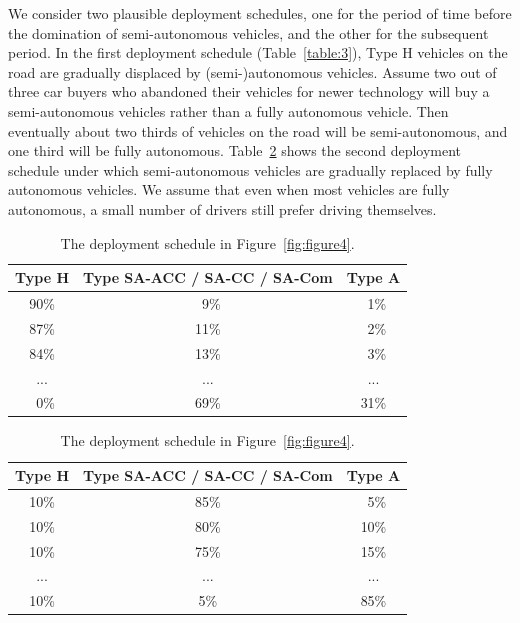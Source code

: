 We consider two plausible deployment schedules, one for the period of
time before the domination of semi-autonomous vehicles, and the other
for the subsequent period.  In the first deployment schedule
(Table~\ref{table:3}), Type H vehicles on the road are gradually
displaced by (semi-)autonomous vehicles.  Assume two out of three car
buyers who abandoned their vehicles for newer technology will buy a
semi-autonomous vehicles rather than a fully autonomous vehicle.  Then
eventually about two thirds of vehicles on the road will be
semi-autonomous, and one third will be fully autonomous.
Table~\ref{table:4} shows the second deployment schedule under which
semi-autonomous vehicles are gradually replaced by fully autonomous
vehicles. We assume that even when most vehicles are fully autonomous,
a small number of drivers still prefer driving themselves.

\begin{table}[t]

\caption{The deployment schedule in Figure~\ref{fig:figure3}.}
\label{table:3}
\centering
\small
\begin{tabular}{|c|c|c|}
    \hline
    Type H&  Type SA-ACC / SA-CC / SA-Com &    Type A\\
    \hline
    90\% &      \ 9\% &   \ 1\% \\
    \hline
    87\% &     11\% &    \ 2\% \\
    \hline
    84\% &     13\% &    \ 3\% \\
    \hline
     ...&   ...&   ...\\
    \hline
    \ 0\%&     69\% &  31\% \\
    \hline
\end{tabular}

\mbox{}

\caption{The deployment schedule in Figure~\ref{fig:figure4}.}
\label{table:4}
\centering
\small
\begin{tabular}{|c|c|c|}
    \hline
     Type H&  Type SA-ACC / SA-CC / SA-Com &    Type A\\
    \hline
     10\%&     85\%&   \ 5\% \\
    \hline
     10\%&     80\%&  10\% \\
    \hline
     10\%&     75\%&  15\% \\
    \hline
      ...&  ... &  ...\\
    \hline
     10\%&       5\%&  85\% \\
    \hline
\end{tabular}
\vspace{-.3in}
\end{table}

